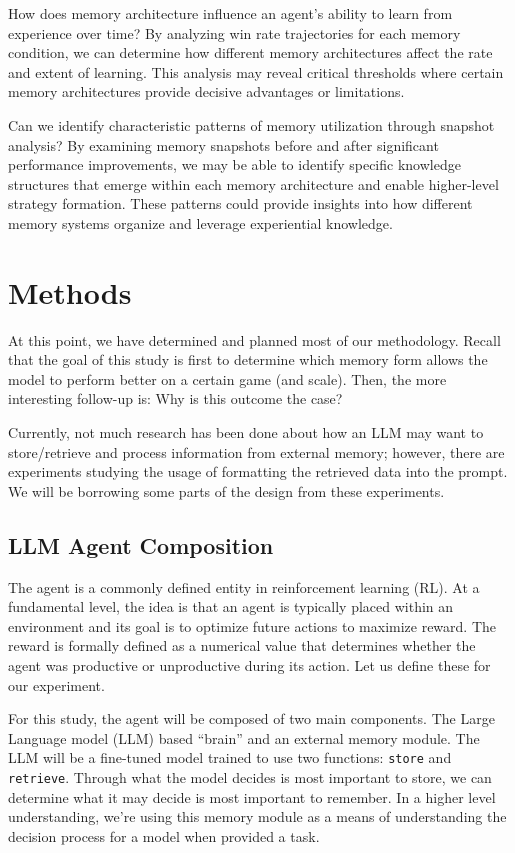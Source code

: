 \documentclass{article}
\begin{document}
How does memory architecture influence an agent's ability to learn from experience over time? By analyzing win rate trajectories for each memory condition, we can determine how different memory architectures affect the rate and extent of learning. This analysis may reveal critical thresholds where certain memory architectures provide decisive advantages or limitations.

Can we identify characteristic patterns of memory utilization through snapshot analysis? By examining memory snapshots before and after significant performance improvements, we may be able to identify specific knowledge structures that emerge within each memory architecture and enable higher-level strategy formation. These patterns could provide insights into how different memory systems organize and leverage experiential knowledge.


\section{Methods}
At this point, we have determined and planned most of our methodology. Recall that the goal of this study is first to determine which memory form allows the model to perform better on a certain game (and scale). Then, the more interesting follow-up is: Why is this outcome the case?

Currently, not much research has been done about how an LLM may want to store/retrieve and process information from external memory; however, there are experiments studying the usage of formatting the retrieved data into the prompt. We will be borrowing some parts of the design from these experiments.

\subsection{LLM Agent Composition}
The agent is a commonly defined entity in reinforcement learning (RL). At a fundamental level, the idea is that an agent is typically placed within an environment and its goal is to optimize future actions to maximize reward. The reward is formally defined as a numerical value that determines whether the agent was productive or unproductive during its action. Let us define these for our experiment.

For this study, the agent will be composed of two main components. The Large Language model (LLM) based ``brain'' and an external memory module. The LLM will be a fine-tuned model trained to use two functions: \verb|store| and \verb|retrieve|. Through what the model decides is most important to store, we can determine what it may decide is most important to remember. In a higher level understanding, we're using this memory module as a means of understanding the decision process for a model when provided a task.
\end{document}
